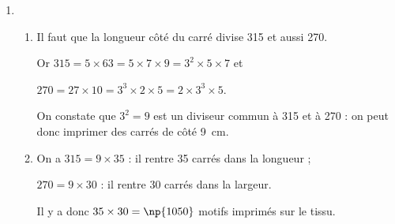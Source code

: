 \begin{enumerate}
\item %

	\begin{enumerate}
		\item %
		
Il faut que la longueur côté du carré divise 315 et aussi 270.

Or $315 = 5 \times 63 = 5 \times 7 \times 9 = 3^2 \times 5 \times 7$ et 

$270 = 27 \times 10 = 3^3 \times 2 \times 5 = 2 \times 3^3 \times 5$.

On constate que $3^2 = 9$ est un diviseur commun à 315 et à 270 : on peut donc imprimer des carrés de côté 9~cm.
		\item %
		
On a $315 = 9 \times 35$ : il rentre 35 carrés dans la longueur ;

$270 = 9 \times 30$ : il rentre 30 carrés dans la largeur.

Il y a donc $35 \times 30 = \np{1050}$ motifs imprimés sur le tissu.
	\end{enumerate}
\end{enumerate}

\bigskip

